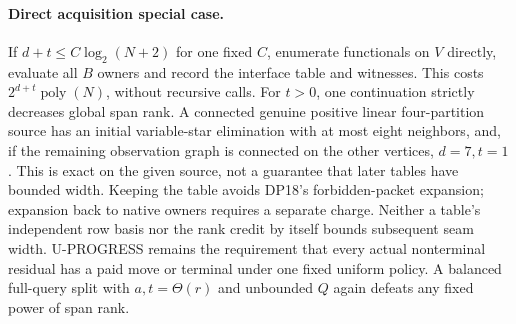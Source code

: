 \documentclass[11pt]{article}
\begin{document}
\paragraph{Direct acquisition special case.}
If $d+t\le C\log_2(N+2)$ for one fixed $C$, enumerate functionals on $V$ directly, evaluate all $B$ owners and record the interface table and witnesses. This costs $2^{d+t}\operatorname{poly}(N)$, without recursive calls. For $t>0$, one continuation strictly decreases global span rank. A connected genuine positive linear four-partition source has an initial variable-star elimination with at most eight neighbors, and, if the remaining observation graph is connected on the other vertices, $d=7,t=1$. This is exact on the given source, not a guarantee that later tables have bounded width. Keeping the table avoids DP18's forbidden-packet expansion; expansion back to native owners requires a separate charge. Neither a table's independent row basis nor the rank credit by itself bounds subsequent seam width. U-PROGRESS remains the requirement that every actual nonterminal residual has a paid move or terminal under one fixed uniform policy. A balanced full-query split with $a,t=\Theta(r)$ and unbounded $Q$ again defeats any fixed power of span rank.
\end{document}
